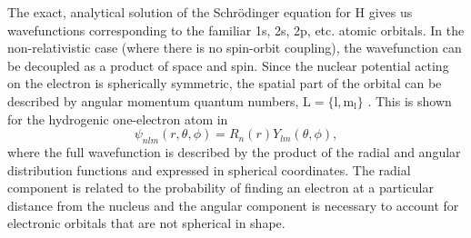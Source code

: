 \documentclass[11pt, twoside]{report}
\begin{document}

The exact, analytical solution of the Schr{\"o}dinger equation for H gives us wavefunctions corresponding to the familiar 1s, 2s, 2p, etc. atomic orbitals. 
In the non-relativistic case (where there is no spin-orbit coupling), the wavefunction can be decoupled as a product of space and spin. Since the nuclear potential acting on the electron is spherically symmetric, the spatial part of the orbital can be described by angular momentum quantum numbers, $\mathrm{L=\{l,m_l\}}$ \cite{RichardMartin_Ch10}. This is shown for the hydrogenic one-electron atom in
\begin{equation}\label{SE_rad+ang}
\psi_{nlm}(r, \theta, \phi) = R_n(r) Y_{lm}(\theta, \phi),
\end{equation}
where the full wavefunction is described by the product of the radial and angular distribution functions and expressed in spherical coordinates. The radial component is related to the probability of finding an electron at a particular distance from the nucleus and the angular component is necessary to account for electronic orbitals that are not spherical in shape.



\end{document}
